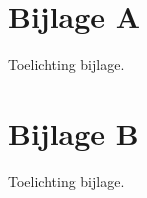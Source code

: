 \begin{appendices}
\section*{Bijlage A}

Toelichting bijlage.

\lipsum[6-8]

\newpage
\section*{Bijlage B}

Toelichting bijlage.

\lipsum[16-28]

\end{appendices}
